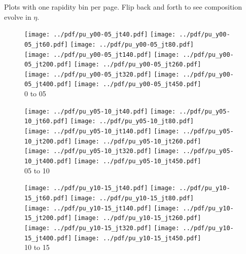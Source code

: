 \documentclass[landscape,10pt]{beamer} %
\begin{document}
\newpage

Plots with one rapidity bin per page. Flip back and forth to see composition evolve in $\eta$.

\newpage

\begin{figure}[p]
\texttt{[image: ../pdf/pu\_y00-05\_jt40.pdf]}
\texttt{[image: ../pdf/pu\_y00-05\_jt60.pdf]}
\texttt{[image: ../pdf/pu\_y00-05\_jt80.pdf]}\\
\texttt{[image: ../pdf/pu\_y00-05\_jt140.pdf]}
\texttt{[image: ../pdf/pu\_y00-05\_jt200.pdf]}
\texttt{[image: ../pdf/pu\_y00-05\_jt260.pdf]}\\
\texttt{[image: ../pdf/pu\_y00-05\_jt320.pdf]}
\texttt{[image: ../pdf/pu\_y00-05\_jt400.pdf]}
\texttt{[image: ../pdf/pu\_y00-05\_jt450.pdf]}
\\
0 to 05
\end{figure}

\newpage

\begin{figure}[p]
\texttt{[image: ../pdf/pu\_y05-10\_jt40.pdf]}
\texttt{[image: ../pdf/pu\_y05-10\_jt60.pdf]}
\texttt{[image: ../pdf/pu\_y05-10\_jt80.pdf]}\\
\texttt{[image: ../pdf/pu\_y05-10\_jt140.pdf]}
\texttt{[image: ../pdf/pu\_y05-10\_jt200.pdf]}
\texttt{[image: ../pdf/pu\_y05-10\_jt260.pdf]}\\
\texttt{[image: ../pdf/pu\_y05-10\_jt320.pdf]}
\texttt{[image: ../pdf/pu\_y05-10\_jt400.pdf]}
\texttt{[image: ../pdf/pu\_y05-10\_jt450.pdf]}
\\
05 to 10
\end{figure}

\newpage

\begin{figure}[p]
\texttt{[image: ../pdf/pu\_y10-15\_jt40.pdf]}
\texttt{[image: ../pdf/pu\_y10-15\_jt60.pdf]}
\texttt{[image: ../pdf/pu\_y10-15\_jt80.pdf]}\\
\texttt{[image: ../pdf/pu\_y10-15\_jt140.pdf]}
\texttt{[image: ../pdf/pu\_y10-15\_jt200.pdf]}
\texttt{[image: ../pdf/pu\_y10-15\_jt260.pdf]}\\
\texttt{[image: ../pdf/pu\_y10-15\_jt320.pdf]}
\texttt{[image: ../pdf/pu\_y10-15\_jt400.pdf]}
\texttt{[image: ../pdf/pu\_y10-15\_jt450.pdf]}
\\
10 to 15
\end{figure}
\end{document}
